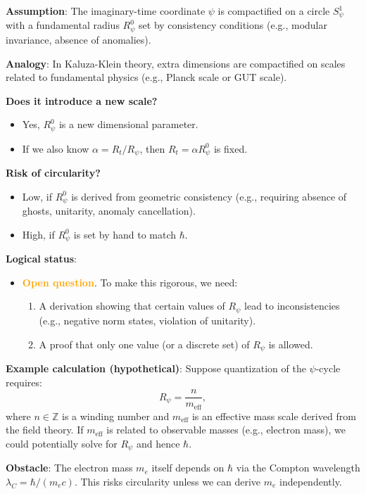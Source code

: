 \documentclass[12pt]{article}
\begin{document}
\textbf{Assumption}: The imaginary-time coordinate $\psi$ is compactified on a circle $S^1_\psi$ with a fundamental radius $R_\psi^0$ set by consistency conditions (e.g., modular invariance, absence of anomalies).

\textbf{Analogy}: In Kaluza-Klein theory, extra dimensions are compactified on scales related to fundamental physics (e.g., Planck scale or GUT scale).

\textbf{Does it introduce a new scale?}
\begin{itemize}
\item Yes, $R_\psi^0$ is a new dimensional parameter.
\item If we also know $\alpha = R_t / R_\psi$, then $R_t = \alpha R_\psi^0$ is fixed.
\end{itemize}

\textbf{Risk of circularity?}
\begin{itemize}
\item Low, if $R_\psi^0$ is derived from geometric consistency (e.g., requiring absence of ghosts, unitarity, anomaly cancellation).
\item High, if $R_\psi^0$ is set by hand to match $\hbar$.
\end{itemize}

\textbf{Logical status}:
\begin{itemize}
\item \textcolor{orange}{\textbf{Open question}}. To make this rigorous, we need:
\begin{enumerate}
\item A derivation showing that certain values of $R_\psi$ lead to inconsistencies (e.g., negative norm states, violation of unitarity).
\item A proof that only one value (or a discrete set) of $R_\psi$ is allowed.
\end{enumerate}
\end{itemize}

\textbf{Example calculation (hypothetical)}:
Suppose quantization of the $\psi$-cycle requires:
\[
R_\psi = \frac{n}{m_{\text{eff}}},
\]
where $n \in \mathbb{Z}$ is a winding number and $m_{\text{eff}}$ is an effective mass scale derived from the field theory. If $m_{\text{eff}}$ is related to observable masses (e.g., electron mass), we could potentially solve for $R_\psi$ and hence $\hbar$.

\textbf{Obstacle}: The electron mass $m_e$ itself depends on $\hbar$ via the Compton wavelength $\lambda_C = \hbar / (m_e c)$. This risks circularity unless we can derive $m_e$ independently.
\end{document}
